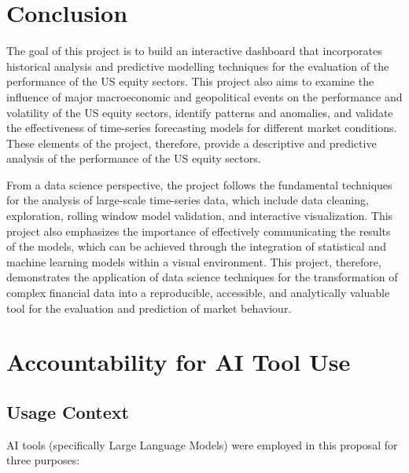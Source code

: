 \documentclass{article}
\begin{document}
\section{Conclusion}

The goal of this project is to build an interactive dashboard that incorporates historical analysis and predictive modelling techniques for the evaluation of the performance of the US equity sectors. This project also aims to examine the influence of major macroeconomic and geopolitical events on the performance and volatility of the US equity sectors, identify patterns and anomalies, and validate the effectiveness of time-series forecasting models for different market conditions. These elements of the project, therefore, provide a descriptive and predictive analysis of the performance of the US equity sectors.

\vspace{0.5em}

\noindent From a data science perspective, the project follows the fundamental techniques for the analysis of large-scale time-series data, which include data cleaning, exploration, rolling window model validation, and interactive visualization. This project also emphasizes the importance of effectively communicating the results of the models, which can be achieved through the integration of statistical and machine learning models within a visual environment. This project, therefore, demonstrates the application of data science techniques for the transformation of complex financial data into a reproducible, accessible, and analytically valuable tool for the evaluation and prediction of market behaviour.

\section{Accountability for AI Tool Use}

\subsection{Usage Context}
AI tools (specifically Large Language Models) were employed in this proposal for three purposes:
\end{document}
